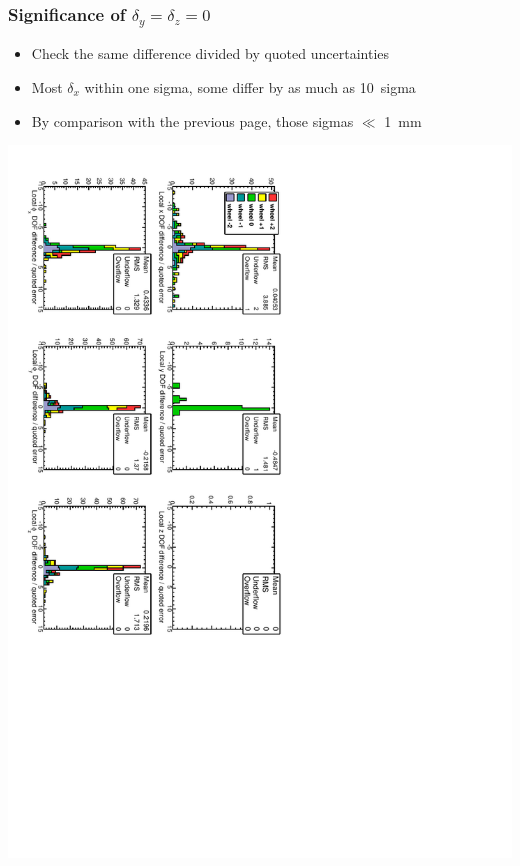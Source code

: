 \documentclass[compress]{beamer}
\begin{document}
\begin{frame}
\frametitle{Significance of $\delta_y = \delta_z = 0$}

\begin{itemize}
\item Check the same difference divided by quoted uncertainties
\item Most $\delta_x$ within one sigma, some differ by as much as 10~sigma
\item By comparison with the previous page, those sigmas $\ll$ 1~mm
\end{itemize}

\vfill
\includegraphics[height=\linewidth, angle=90]{data_effect_of_fixingdof_norm.pdf}
\end{frame}
\end{document}
